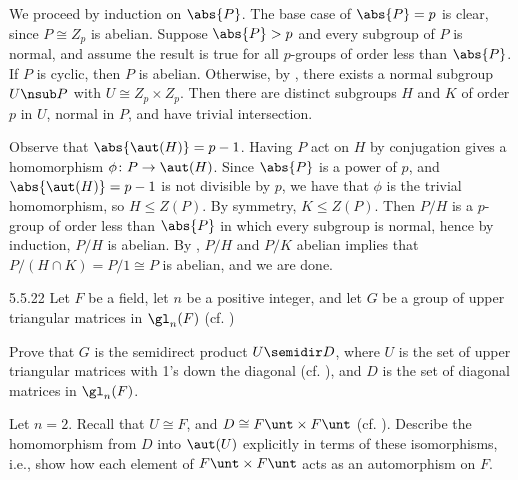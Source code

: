 \begin{sol}
    We proceed by induction on $\abs{P}$.
    The base case of $\abs{P} = p$ is clear, since $P \cong Z_p$ is abelian.
    Suppose $\abs{P} > p$ and every subgroup of $P$ is normal, and assume the result is true for all $p$-groups of order less than $\abs{P}$.
    If $P$ is cyclic, then $P$ is abelian.
    Otherwise, by , there exists a normal subgroup $U \nsub P$ with $U \cong Z_p \times Z_p$.
    Then there are distinct subgroups $H$ and $K$ of order $p$ in $U$, normal in $P$, and have trivial intersection.

    Observe that $\abs{\aut(H)} = p - 1$.
    Having $P$ act on $H$ by conjugation gives a homomorphism $\phi \colon P \to \aut(H)$.
    Since $\abs{P}$ is a power of $p$, and $\abs{\aut(H)} = p - 1$ is not divisible by $p$, we have that $\phi$ is the trivial homomorphism, so $H \leq Z(P)$.
    By symmetry, $K \leq Z(P)$.
    Then $P/H$ is a $p$-group of order less than $\abs{P}$ in which every subgroup is normal, hence by induction, $P/H$ is abelian.
    By , $P/H$ and $P/K$ abelian implies that $P/(H \cap K) = P/1 \cong P$ is abelian, and we are done.
\end{sol}

\begin{exercise}{5.5.22}
    Let $F$ be a field, let $n$ be a positive integer, and let $G$ be a group of upper triangular matrices in $\gl_n(F)$ (cf. )
    \begin{subexercises}
        \item Prove that $G$ is the semidirect product $U \semidir D$, where $U$ is the set of upper triangular matrices with 1's down the diagonal (cf. ), and $D$ is the set of diagonal matrices in $\gl_n(F)$.
        \item Let $n = 2$.
	    Recall that $U \cong F$, and $D \cong F\unt \times F\unt$ (cf. ).
	    Describe the homomorphism from $D$ into $\aut(U)$ explicitly in terms of these isomorphisms, i.e., show how each element of $F\unt \times F\unt$ acts as an automorphism on $F$.
    \end{subexercises}
\end{exercise}

